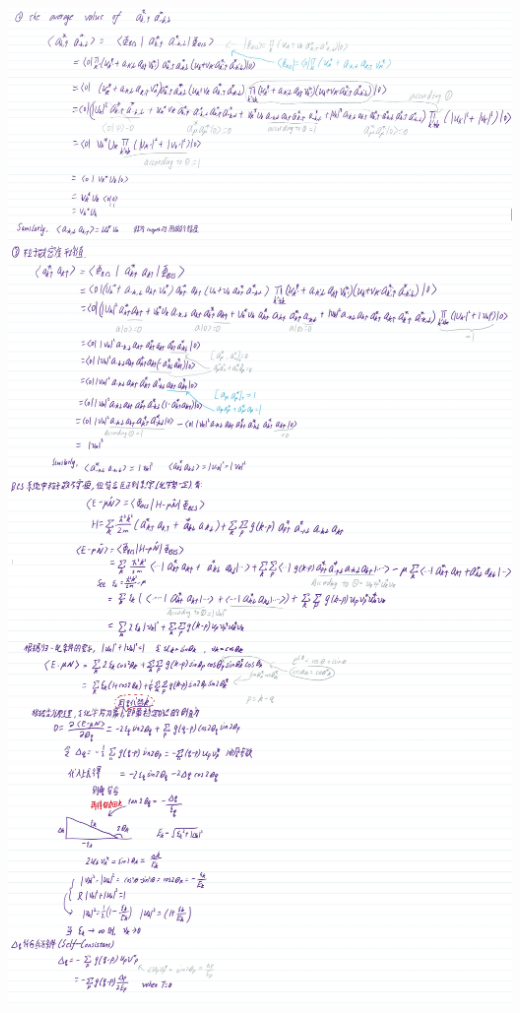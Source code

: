 \documentclass[11pt,largemargins]{homework}
\begin{document}
\includegraphics[scale=0.57]{Question/Task1-2.jpg}\\
\includegraphics[scale=0.57]{Question/Task1-3.jpg}\\
\includegraphics[scale=0.57]{Question/Task1-4.jpg}\\
\includegraphics[scale=0.57]{Question/Task1-5.jpg}\\
\end{document}
